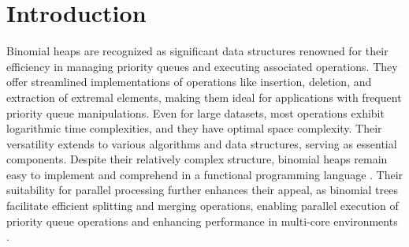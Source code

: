 \documentclass{clmthesis}
\begin{document}
\maketitle
\tableofcontents
%
\chapter{Introduction}

Binomial heaps are recognized as significant data structures renowned for their efficiency in managing priority queues and executing associated operations. They offer streamlined implementations of operations like insertion, deletion, and extraction of extremal elements, making them ideal for applications with frequent priority queue manipulations. Even for large datasets, most operations exhibit logarithmic time complexities, and they have optimal space complexity. Their versatility extends to various algorithms and data structures, serving as essential components. Despite their relatively complex structure, binomial heaps remain easy to implement and comprehend in a functional programming language \cite{thomas2022, king1994functional, okasaki1999}. Their suitability for parallel processing further enhances their appeal, as binomial trees facilitate efficient splitting and merging operations, enabling parallel execution of priority queue operations and enhancing performance in multi-core environments \cite{das2000parallel}.
\end{document}
